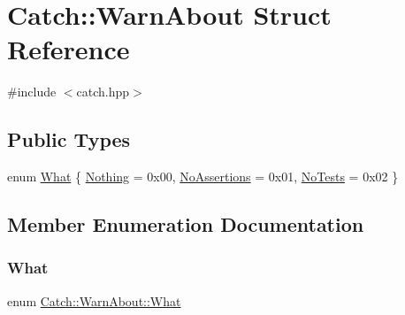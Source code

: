 \hypertarget{struct_catch_1_1_warn_about}{}\section{Catch\+::Warn\+About Struct Reference}
\label{struct_catch_1_1_warn_about}


{\ttfamily \#include $<$catch.\+hpp$>$}

\subsection*{Public Types}
\begin{DoxyCompactItemize}
\item 
enum \mbox{\hyperlink{struct_catch_1_1_warn_about_ae3dde70ef78d700ea896eb29314e0fa3}{What}} \{ \mbox{\hyperlink{struct_catch_1_1_warn_about_ae3dde70ef78d700ea896eb29314e0fa3a9ac33f9211280cca9082557329706d27}{Nothing}} = 0x00, 
\mbox{\hyperlink{struct_catch_1_1_warn_about_ae3dde70ef78d700ea896eb29314e0fa3a516a40a437d6ff29898e2fa93bca8f82}{No\+Assertions}} = 0x01, 
\mbox{\hyperlink{struct_catch_1_1_warn_about_ae3dde70ef78d700ea896eb29314e0fa3ab449dacc48055ee886a4a7aa283db556}{No\+Tests}} = 0x02
 \}
\end{DoxyCompactItemize}


\subsection{Member Enumeration Documentation}
\mbox{\label{struct_catch_1_1_warn_about_ae3dde70ef78d700ea896eb29314e0fa3}} 
\subsubsection{\texorpdfstring{What}{What}}
{\footnotesize\ttfamily enum \mbox{\hyperlink{struct_catch_1_1_warn_about_ae3dde70ef78d700ea896eb29314e0fa3}{Catch\+::\+Warn\+About\+::\+What}}}

